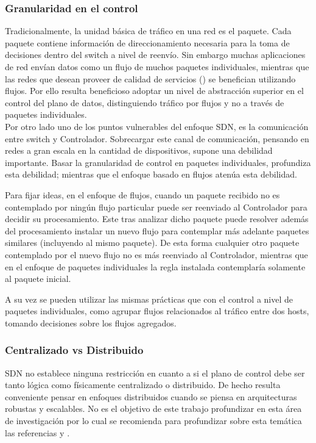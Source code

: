 \newpage
\subsubsection{Granularidad en el control}
Tradicionalmente, la unidad básica de tráfico en una red es el paquete. Cada paquete contiene información de direccionamiento necesaria para la toma de decisiones dentro del switch a nivel de reenvío. Sin embargo muchas aplicaciones de red envían datos como un flujo de muchos paquetes individuales, mientras que las redes que desean proveer de calidad de servicios () se benefician utilizando flujos. Por ello resulta beneficioso adoptar un nivel de abstracción superior en el control del plano de datos, distinguiendo tr\'afico por flujos y no a través de paquetes individuales.\\
 
Por otro lado uno de los puntos vulnerables del enfoque SDN, es la comunicación entre switch y Controlador. Sobrecargar este canal de comunicación, pensando en redes a gran escala en la cantidad de dispositivos, supone una debilidad importante. Basar la granularidad de control en paquetes individuales, profundiza esta debilidad; mientras que el enfoque basado en flujos atenúa esta debilidad. 

Para fijar ideas, en el enfoque de flujos, cuando un paquete recibido no es contemplado por ning\'un flujo particular puede ser reenviado al Controlador para decidir su procesamiento. Este tras analizar dicho paquete puede resolver adem\'as del procesamiento instalar un nuevo flujo para contemplar m\'as adelante paquetes similares (incluyendo al mismo paquete). De esta forma cualquier otro paquete contemplado por el nuevo flujo no es m\'as reenviado al Controlador, mientras que en el enfoque de paquetes individuales la regla instalada contemplar\'ia solamente al paquete inicial.

A su vez se pueden utilizar las mismas prácticas que con el control a nivel
de paquetes individuales, como agrupar flujos relacionados al tráfico entre dos hosts, tomando
decisiones sobre los flujos agregados. 

\subsubsection{Centralizado vs Distribuido}
SDN no establece ninguna restricción en cuanto a si el plano de control debe ser tanto lógica como físicamente centralizado o distribuido. De hecho resulta conveniente pensar en enfoques distribuidos cuando se piensa en arquitecturas robustas y escalables. No es el objetivo de este trabajo profundizar en esta área de investigación por lo cual se recomienda para profundizar sobre esta temática las referencias \cite{heller2012controller} y \cite{levin2012logically}. 

